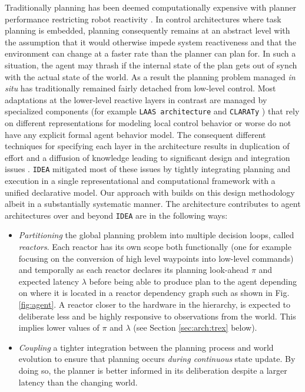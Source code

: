 Traditionally planning has been deemed computationally expensive with
planner performance restricting robot reactivity
\cite{ghallab04,Dias:2003ua}. In control architectures where task
planning is embedded, planning consequently remains at an abstract
level with the assumption that it would otherwise impede system
reactiveness and that the environment can change at a faster rate than
the planner can plan for. In such a situation, the agent may thrash if
the internal state of the plan gets out of synch with the actual state
of the world. As a result the planning problem managed {\em in situ}
has traditionally remained fairly detached from low-level
control. Most adaptations at the lower-level reactive layers in
contrast are managed by specialized components (for example
\texttt{LAAS architecture} \cite{alami:1998p820,Ingrand07} and
\texttt{CLARATy} \cite{Nesnas:2003do}) that rely on different
representations for modeling local control behavior or worse do not
have any explicit formal agent behavior model. The consequent
different techniques for specifying each layer in the architecture
results in duplication of effort and a diffusion of knowledge leading
to significant design and integration issues \cite{DS1report}.
\texttt{IDEA} mitigated most of these issues by tightly integrating
planning and execution in a single representational and computational
framework with a unified declarative model. Our approach with \rx
builds on this design methodology albeit in a substantially systematic
manner. The \rx architecture contributes to agent architectures over
and beyond \texttt{IDEA} are in the following ways:

\begin{itemize}

\item \emph{Partitioning} the global planning problem into multiple
  decision loops, called {\em reactors}. Each reactor has its own
  scope both functionally (one for example focusing on the conversion
  of high level waypoints into low-level commands) and temporally as
  each reactor declares its planning look-ahead $\pi$ and expected
  latency $\lambda$ before being able to produce plan to the agent
  depending on where it is located in a reactor dependency graph such
  as shown in Fig. \ref{fig:agent}. A reactor closer to the hardware
  in the hierarchy, is expected to deliberate less and be highly
  responsive to observations from the world. This implies lower values
  of $\pi$ and $\lambda$ (see Section \ref{sec:arch:trex} below).

\item \emph{Coupling} a tighter integration between the planning
  process and world evolution to ensure that planning occurs
  \emph{during continuous} state update. By doing so, the planner is
  better informed in its deliberation despite a larger latency than
  the changing world.

\end{itemize}

